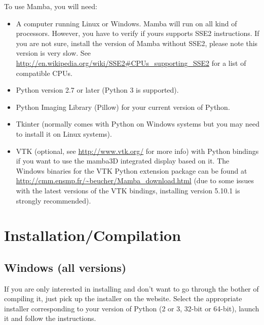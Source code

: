 \documentclass[a4paper,10pt,oneside]{article}
\begin{document}
To use Mamba, you will need:
\begin{itemize}
\item A computer running Linux or Windows. Mamba will run on all kind of 
processors. However, you have to verify if yours supports SSE2 instructions. If you
are not sure, install the version of Mamba without SSE2, please note this version
is very slow. See \url{http://en.wikipedia.org/wiki/SSE2#CPUs_supporting_SSE2}
for a list of compatible CPUs.
\item Python version 2.7 or later (Python 3 is supported).
\item Python Imaging Library (Pillow) for your current version of Python.
\item Tkinter (normally comes with Python on Windows systems but you may need to
install it on Linux systems).
\item VTK (optional, see \url{http://www.vtk.org/} for more info) with Python
bindings if you want to use the mamba3D integrated display based on it. The Windows
binaries for the VTK Python extension package can be found at
\url{http://cmm.ensmp.fr/~beucher/Mamba_download.html} (due to some issues with the
latest versions of the VTK bindings, installing version 5.10.1 is strongly recommended).
\end{itemize}



\pagebreak

\section{Installation/Compilation}
\label{cha:inst_comp}

\subsection{Windows (all versions)}

If you are only interested in installing and don't want to go through the bother
of compiling it, just pick up the installer on the website. Select the appropriate
installer corresponding to your version of Python (2 or 3, 32-bit or 64-bit), 
launch it and follow the instructions.
\end{document}
